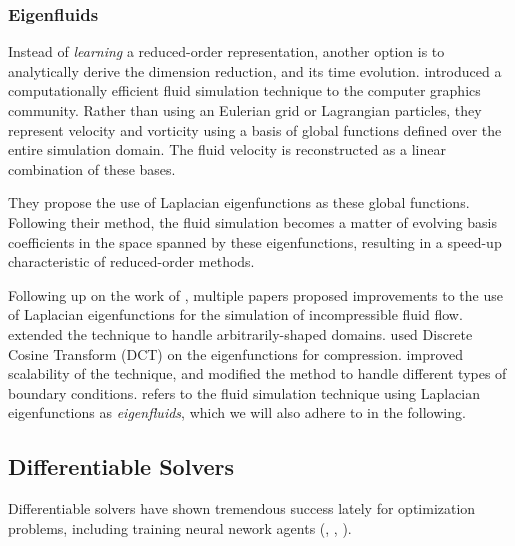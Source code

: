 \subsubsection*{Eigenfluids}
Instead of \textit{learning} a reduced-order representation, another option is
to analytically derive the dimension reduction, and its time evolution.
\cite{dewitt} introduced a computationally efficient fluid simulation technique
to the computer graphics community. Rather than using an Eulerian grid or
Lagrangian particles, they represent velocity and vorticity using a basis of
global functions defined over the entire simulation domain. The fluid velocity
is reconstructed as a linear combination of these bases.

They propose the use of Laplacian eigenfunctions as these global functions.
Following their method, the fluid simulation becomes a matter of evolving basis
coefficients in the space spanned by these eigenfunctions, resulting in
a speed-up characteristic of reduced-order methods. 

Following up on the work of \cite{dewitt}, multiple papers proposed improvements
to the use of Laplacian eigenfunctions for the simulation of incompressible
fluid flow. \cite{ModelReductionFluidSim} extended the technique to handle
arbitrarily-shaped domains. \cite{EigenfluidCompression} used Discrete Cosine
Transform (DCT) on the eigenfunctions for compression.
\cite{scalable-eigenfluids} improved scalability of the technique, and modified
the method to handle different types of boundary conditions.
\cite{scalable-eigenfluids} refers to the fluid simulation technique using
Laplacian eigenfunctions as \textit{eigenfluids}, which we will also adhere to
in the following.


\subsection{Differentiable Solvers}
Differentiable solvers have shown tremendous success lately for optimization
problems, including training neural nework agents
(\cite{holl2019pdecontrol}, \cite{difftaichi}, \cite{warp2022}).


